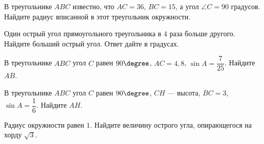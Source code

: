 \begin{homework}[number=4]
\begin{listofex}
		\item В треугольнике \(ABC\) известно, что \(AC = 36\), \(BC = 15\), а угол \(\angle C=90\) градусов. Найдите радиус вписанной в этот треугольник окружности.
		\item Один острый угол прямоугольного треугольника в \( 4 \) раза больше другого. Найдите больший острый угол. Ответ дайте в градусах.
		\item В треугольнике \(ABC\) угол \(C\) равен \(90 \degree \), \(AC=4,8\), \(\sin{A} = \dfrac{7}{25}\). Найдите \(AB\).
		\item В треугольнике \(ABC\) угол \(C\) равен \(90 \degree \), \(CH\) --- высота, \(BC=3\), \(\sin{A} = \dfrac{1}{6}\). Найдите \(AH\).
		\item Радиус окружности равен \(1\). Найдите величину острого угла, опирающегося на хорду \(\sqrt{3}\).
	\end{listofex}
\end{homework}



